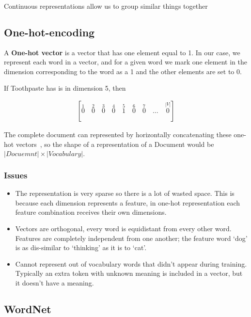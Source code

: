 \documentclass[11pt]{article}
\begin{document}
Continuous representations allow us to group similar things together

\subsection{One-hot-encoding}

A \textbf{One-hot vector} is a vector that has one element equal to 1. In our case, we represent each word in a vector, and for a given word we mark one element in the dimension corresponding to the word as a 1 and the other elements are set to 0.

If Toothpaste has is in dimension 5, then

\begin{align*}
    \left[\stackrel{1}{0} \quad \stackrel{2}{0} \quad \stackrel{3}{0} \quad \stackrel{4}{0} \quad \stackrel{5}{1} \quad \stackrel{6}{0} \quad \stackrel{7}{0} \quad \ldots \quad \stackrel{|V|}{0}  \right]
\end{align*}

The complete document can represented by horizontally concatenating these one-hot vectors~\cite{git-natural-language-processing}, so the shape of a representation of a Document would be $|Docuemnt| \times |Vocabulary|$.

\subsubsection{Issues}

\begin{itemize}
    \item The representation is very sparse so there is a lot of wasted space. This is because each dimension represents a feature, in one-hot representation each feature combination receives their own dimensions.

    \item Vectors are orthogonal, every word is equidistant from every other word. Features are completely independent from one another; the feature word `dog' is as dis-similar to `thinking' as it is to `cat'.
    
    \item Cannot represent out of vocabulary words that didn't appear during training. Typically an extra token with unknown meaning is included in a vector, but it doesn't have a meaning.
\end{itemize}

\subsection{WordNet}
\end{document}
